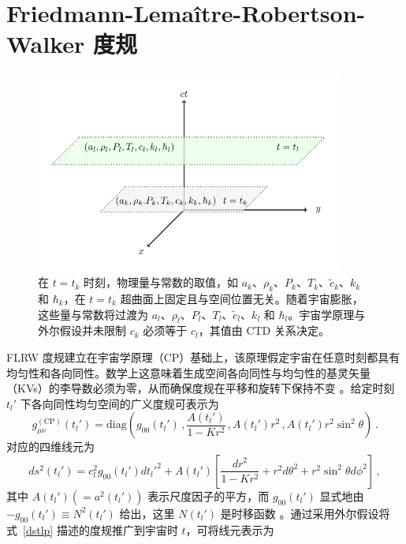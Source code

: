 \documentclass[jkps,preprint,fleqn]{revtex4}
\newcommand{\tc}{\tilde{c}}
\begin{document}
\section{Friedmann-Lemaître-Robertson-Walker 度规}
\label{sec:RWm}
\begin{figure}
	\begin{center}
	\includegraphics[width=0.9\textwidth]{Fig1.pdf}
	\caption{在 $t = t_k$ 时刻，物理量与常数的取值，如 $a_k$、$\rho_k$、$P_k$、$T_k$、$\tc_k$、$k_{k}$ 和 $\hbar_k$，在 $t=t_k$ 超曲面上固定且与空间位置无关。随着宇宙膨胀，这些量与常数将过渡为 $a_l$、$\rho_l$、$P_l$、$T_l$、$\tc_l$、$k_l$ 和 $\hbar_l$。宇宙学原理与外尔假设并未限制 $c_k$ 必须等于 $c_l$，其值由 CTD 关系决定。}
	\label{Fig1}
	\end{center}
\end{figure}
FLRW 度规建立在宇宙学原理（CP）基础上，该原理假定宇宙在任意时刻都具有均匀性和各向同性。数学上这意味着生成空间各向同性与均匀性的基灵矢量（KVs）的李导数必须为零，从而确保度规在平移和旋转下保持不变 \cite{Lee:2024mal,Ryder09}。给定时刻 $t_l'$ 下各向同性均匀空间的广义度规可表示为
\begin{equation}
g_{\mu\nu}^{(\text{CP})}(t_l') = \text{diag} \left( g_{00}(t_l') \,,  \frac{A(t_l')}{1-Kr^2} \,,  A(t_l') r^2 \,,  A(t_l') r^2 \sin^2 \theta \right) \,.
\end{equation}
对应的四维线元为
\begin{equation}
ds^2(t_l') = c_l^2 g_{00}(t_l') dt_l'^2 + A(t_l') \left[ \frac{dr^2}{1-Kr^2} + r^2 d \theta^2 + r^2 \sin^2 \theta d \phi^2 \right] \label{dstlp} \,,
\end{equation}
其中 $A(t_l') (= a^2(t_l'))$ 表示尺度因子的平方，而 $g_{00}(t_l')$ 显式地由 $- g_{00}(t_l') \equiv N^2(t_l')$ 给出，这里 $N(t_l')$ 是时移函数 \cite{Lee:2024zcu,Ryder09}。通过采用外尔假设将式~\eqref{dstlp} 描述的度规推广到宇宙时 $t$，可将线元表示为
\end{document}

